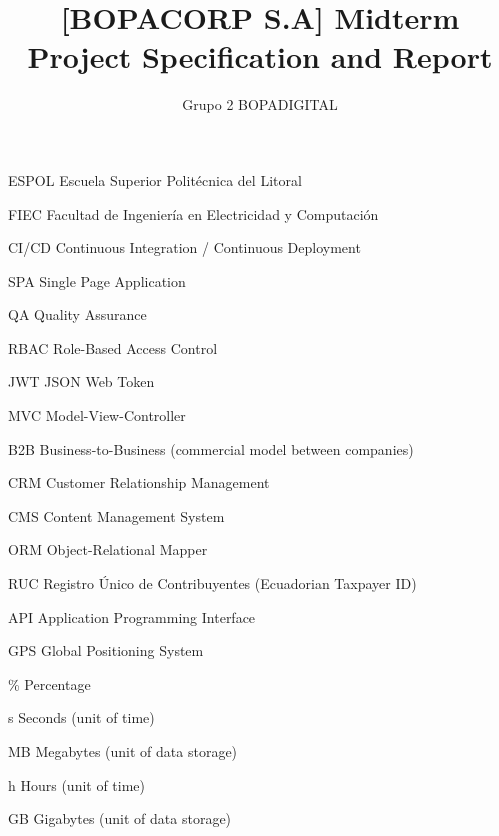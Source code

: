 \documentclass[letterpaper%
, oneside%
, 12pt%
, memoireprojet%
, english%
,creativecommons,hyperref, withAlgo2e %
]{thETS}
\title{[BOPACORP S.A]
Midterm Project Specification and Report}
\author{Grupo 2 BOPADIGITAL}
\begin{document}

\maketitle

\presentjury

\tableofcontents

\listoftables

\listoffigures

\begin{listofabbr}[3cm]
\item [ESPOL] Escuela Superior Politécnica del Litoral
\item [FIEC] Facultad de Ingeniería en Electricidad y Computación
\item [CI/CD] Continuous Integration / Continuous Deployment
\item [SPA] Single Page Application
\item [QA] Quality Assurance
\item [RBAC] Role-Based Access Control
\item [JWT] JSON Web Token
\item [MVC] Model-View-Controller
\item [B2B] Business-to-Business (commercial model between companies)
\item [CRM] Customer Relationship Management
\item [CMS] Content Management System
\item [ORM] Object-Relational Mapper
\item [RUC] Registro Único de Contribuyentes (Ecuadorian Taxpayer ID)
\item [API] Application Programming Interface
\item [GPS] Global Positioning System
\end{listofabbr}

\begin{listofsymbols}[3cm]
\item [\%] Percentage
\item [s] Seconds (unit of time)
\item [MB] Megabytes (unit of data storage)
\item [h] Hours (unit of time)
\item [GB] Gigabytes (unit of data storage)
\end{listofsymbols}
\end{document}
